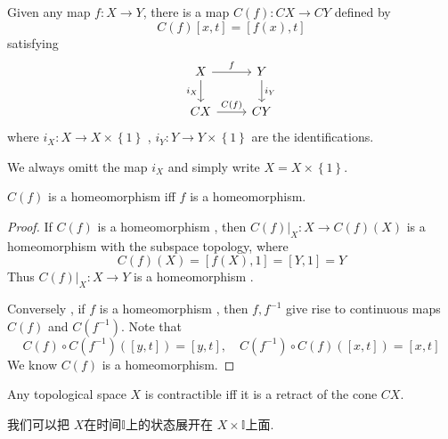 \documentclass[../main.tex]{subfiles}
\begin{document}
\begin{definition}{}{}
    Given any map \(  f:X\to Y  \), there is a map \(  C\left( f \right):CX\to CY   \) defined by \[
     C\left( f \right)\left[ x,t \right]= \left[ f\left( x \right),t  \right]  
    \]satisfying \[
\begin{tikzcd}
    X \arrow[r, "f"] \arrow[d, "i_X"'] & Y \arrow[d, "i_Y"] \\
    CX \arrow[r, "C(f)"] & CY
\end{tikzcd}
\] where \(  i_{X}: X\to X\times \left\{ 1 \right\}  \) , \(  i_{Y}: Y\to Y\times \left\{ 1 \right\}  \) are the identifications. 
\end{definition}

\begin{remark}
    We always omitt the map \(  i_{X}  \) and simply write \(  X= X\times \left\{ 1 \right\}  \).  
\end{remark}

\begin{proposition}{}{}
    \(  C\left( f \right)   \) is a homeomorphism iff \(  f  \) is a homeomorphism.  
\end{proposition}
\begin{proof}
    If \(  C\left( f \right)   \) is a homeomorphism , then \(  C\left( f \right)|_{X}: X\to C\left( f \right)\left( X \right)     \)   is a homeomorphism with the subspace topology, where \[
    C\left( f \right)\left( X \right)= \left[ f\left( X \right),1  \right]= \left[ Y,1 \right]= Y    
    \]Thus \(  C\left( f \right)|_{X}:X\to Y   \) is a homeomorphism .

    Conversely , if \(  f  \) is a homeomorphism , then \(  f, f^{-1}   \) give rise to   continuous maps \(  C\left( f \right)   \) and \(  C\left( f^{-1}  \right)   \). Note that \[
    C\left( f \right)\circ C\left( f^{-1}  \right)\left( [y,t] \right)= [y,t],\quad C\left( f^{-1}  \right)\circ C\left( f \right)\left( [x,t] \right)= [x,t]      
    \]  We know \(  C\left( f \right)   \) is a homeomorphism. 
\end{proof}


\begin{theorem}{}{}
Any topological space $X$ is contractible iff it is a retract of the cone $CX$.
\end{theorem}

\begin{note}
  我们可以把 \(  X  \)在时间\(  \mathbb{I}  \)上的状态展开在    \(  X\times \mathbb{I}  \)上面. 
\end{note}
\end{document}
